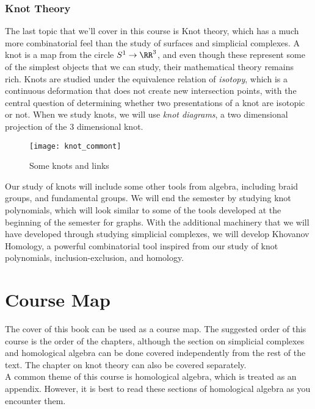 \subsubsection{Knot Theory}
The last topic that we'll cover in this course is Knot theory, which has a much more combinatorial feel than the study of surfaces and simplicial complexes. 
 A knot is a map from the circle $S^1\to \RR^3$, and even though these represent some of the simplest objects that we can study, their mathematical theory remains rich. Knots are studied under the equivalence relation of \emph{isotopy}, which is a continuous deformation that does not create new intersection points, with the central question of determining whether two presentations of a knot are isotopic or not. When we study knots, we will use \emph{knot diagrams}, a two dimensional projection of the 3 dimensional knot. 

\begin{wrapfigure}{r}{5cm}
	\centering
	\texttt{[image: knot\_commont]}
	\caption{Some knots and links}
	\label{fig:knotintro}
\end{wrapfigure}
 Our study of knots will include some other tools from algebra, including braid groups, and fundamental groups. We will  end the semester by studying knot polynomials, which will look similar to some of the tools developed at the beginning of the semester for graphs. With the additional machinery that we will have developed through studying simplicial complexes, we will develop Khovanov Homology, a powerful combinatorial tool inspired from our study of knot polynomials, inclusion-exclusion, and homology. 
\section{Course Map}
The cover of this book can be used as a course map. The suggested order of this course is the order of the chapters, although the section on simplicial complexes and homological algebra can be done covered independently from the rest of the text. The chapter on knot theory can also be covered separately.\\
A common theme of this course is homological algebra, which is treated as an appendix. However, it is best to read these sections of homological algebra as you encounter them. 
 \leavevmode\thispagestyle{empty}\newpage
{}